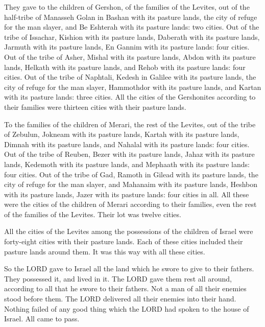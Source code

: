\myverse{}They gave to the children of Gershon, of the families of the
Levites, out of the half-tribe of Manasseh Golan in Bashan with its pasture lands, the city of refuge
for the man slayer, and Be Eshterah with its pasture lands: two cities.
\myverse{}Out of the tribe of Issachar, Kishion with its pasture lands, Daberath with
its pasture lands,
\myverse{}Jarmuth with its pasture lands, En Gannim with its pasture lands: four cities.
\myverse{}Out of the tribe of Asher, Mishal with its pasture lands, Abdon with its
pasture lands,
\myverse{}Helkath with its pasture lands, and Rehob with its pasture lands: four cities.
\myverse{}Out of the tribe of Naphtali, Kedesh in Galilee with its pasture lands, the
city of refuge for the man slayer, Hammothdor with its pasture lands, and Kartan with its pasture lands:
three cities.
\myverse{}All the cities of the Gershonites according to their families were thirteen
cities with their pasture lands.

\myverse{}To the families of the children of Merari, the rest of the Levites,
out of the tribe of Zebulun, Jokneam with its pasture lands, Kartah with its pasture lands,
\myverse{}Dimnah with its pasture lands, and Nahalal with its pasture lands: four cities.
\myverse{}Out of the tribe of Reuben, Bezer with its pasture lands, Jahaz with its
pasture lands,
\myverse{}Kedemoth with its pasture lands, and Mephaath with its pasture lands: four
cities.
\myverse{}Out of the tribe of Gad, Ramoth in Gilead with its pasture lands, the city
of refuge for the man slayer, and Mahanaim with its pasture lands,
\myverse{}Heshbon with its pasture lands, Jazer with its pasture lands: four cities
in all.
\myverse{}All these were the cities of the children of Merari according to their families,
even the rest of the families of the Levites. Their lot was twelve cities.

\myverse{}All the cities of the Levites among the possessions of the children
of Israel were forty-eight cities with their pasture lands.
\myverse{}Each of these cities included their pasture lands around them. It was this
way with all these cities.

\myverse{}So the LORD gave to Israel all the land which he swore to give
to their fathers. They possessed it, and lived in it.
\myverse{}The LORD gave them rest all around, according to all that he swore to their
fathers. Not a man of all their enemies stood before them. The LORD delivered all their enemies into their
hand.
\myverse{}Nothing failed of any good thing which the LORD had spoken to the house of
Israel. All came to pass.


